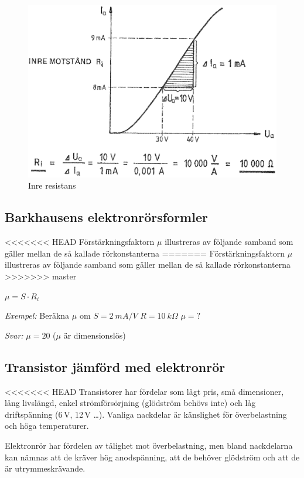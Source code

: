 \begin{figure}[ht]
	\includegraphics{images/cropped_pdfs/bild_2_2-34.pdf}
	\caption{Inre resistans}
	\label{fig:BildII2-34}
\end{figure}

\subsection{Barkhausens elektronrörsformler}

<<<<<<< HEAD
Förstärkningsfaktorn \(\mu \) illustreras av följande samband som
gäller mellan de så kallade rörkonstanterna
=======
Förstärkningsfaktorn \(\mu \) illustreras av följande samband som gäller mellan
de så kallade rörkonstanterna
>>>>>>> master

\(\mu = S \cdot R_i\)

\emph{Exempel:}
Beräkna \(\mu\)  om \(S = 2\ mA/V\) \(R = 10\ k\Omega\) \(\mu = ?\)

\emph{Svar:} \(\mu = 20\) (\(\mu\)  är dimensionslös)

\subsection{Transistor jämförd med elektronrör}

<<<<<<< HEAD
Transistorer har fördelar som lågt pris, små dimensioner, lång
livslängd, enkel strömförsörjning (glödström behövs inte) och låg
driftspänning (6\,V, 12\,V \ldots ). Vanliga nackdelar är känslighet för
överbelastning och höga temperaturer.

Elektronrör har fördelen av tålighet mot överbelastning, men bland
nackdelarna kan nämnas att de kräver hög anodspänning, att de behöver
glödström och att de är utrymmeskrävande.


